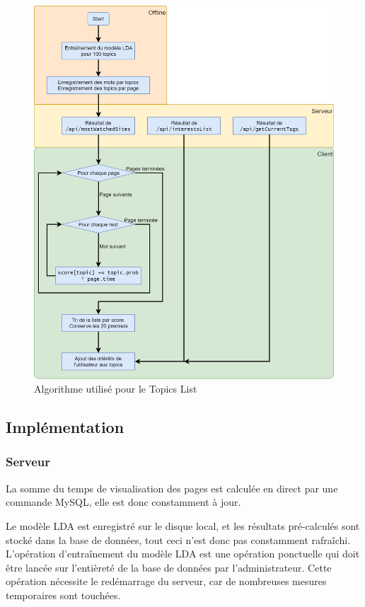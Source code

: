			\begin{figure}[!h]
				\centering
				\includegraphics[height=1.3\textwidth]{images/design/pages/topics_algo}
				\caption{Algorithme utilisé pour le Topics List}
				\label{topics_algo}
			\end{figure}

	\subsection{Implémentation}

		\subsubsection{Serveur}

			La somme du temps de visualisation des pages est calculée en direct par une commande MySQL, elle est donc constamment à jour.

			Le modèle LDA est enregistré sur le disque local, et les résultats pré-calculés sont stocké dans la base de données, tout ceci n'est donc pas constamment rafraîchi. L'opération d'entraînement du modèle LDA est une opération ponctuelle qui doit être lancée sur l'entièreté de la base de données par l'administrateur. Cette opération nécessite le redémarrage du serveur, car de nombreuses mesures temporaires sont touchées.

